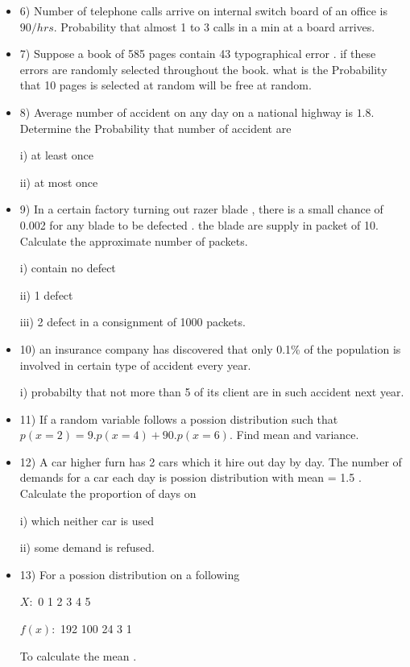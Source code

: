 \documentclass{article}
\begin{document}
\begin{itemize}
    

\item 6) Number of telephone calls arrive on internal switch board of an office is $90/hrs$.  Probability  that almost 1 to 3 calls in a min at a board arrives.

\item 7) Suppose a book of 585 pages contain 43 typographical error . if these errors are randomly selected throughout the book. what is the  Probability  that 10 pages is selected at random will be free at random.

\item 8) Average number of accident on any day on a national highway is $1.8$. Determine the Probability that number of accident are 



i) at least once 

ii) at most once 

\item 9) In a certain factory turning out razer blade , there is a small chance of 0.002
for any blade to be defected . the blade are supply in packet of 10. Calculate the approximate number of packets.


i) contain no defect

ii) 1 defect 

iii) 2 defect in a  consignment of 1000 packets.

\item 10) an insurance company has discovered that only 0.1\% of the population is involved in certain type of accident every year.

i) probabilty that not more than 5 of its client are in such accident next year.

\item 11) If a random variable follows a possion distribution such that $p(x=2) = 9.p(x=4)+90.p(x=6).$ Find mean and variance.

\item 12) A car higher furn has 2 cars which it hire out day by day. The number of demands for a  car each day is possion distribution with mean = 1.5 . Calculate the proportion of days on 

i) which neither car is used 

ii) some demand is refused.

\item 13) For a possion distribution on a following 

$X:$ 0 1 2 3 4 5 

$f(x):$ 192 100 24 3 1

To calculate the mean .
\end{itemize}
\end{document}
